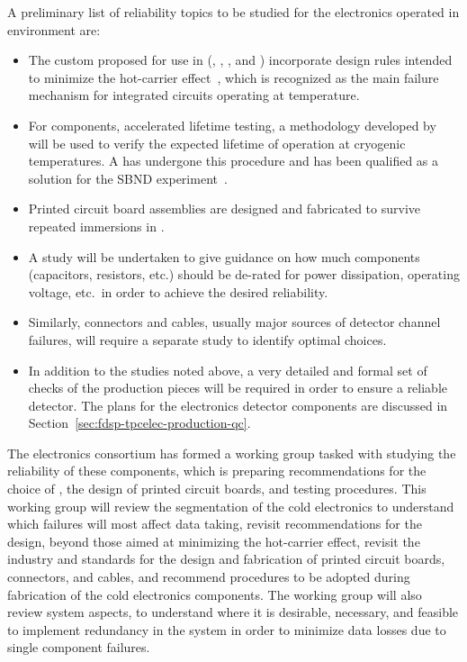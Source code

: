 A preliminary list of reliability topics to be studied for the  electronics operated 
in  environment are:
\begin{itemize}
\item The custom  proposed for use in  (, 
, , and ) incorporate design rules 
intended to minimize the hot-carrier effect~\cite{Li:CELAr,Hoff:2015hax}, 
which is recognized as the main failure mechanism for integrated circuits 
operating at  temperature.
\item For  components, accelerated lifetime testing, a methodology 
developed by ~\cite{nasa_nepp} will be used to verify the expected
lifetime of operation at cryogenic temperatures. A   has undergone
this procedure and has been qualified as a solution for the SBND experiment~\cite{Chen:2018zic}.
\item Printed circuit board assemblies are designed and fabricated to survive 
repeated immersions in \lntwo.
\item A study will be undertaken to give guidance on how much components (capacitors,
resistors, etc.) should be de-rated for power dissipation, operating voltage, etc.~in
order to achieve the desired reliability.
\item Similarly, connectors and cables, usually major sources of detector channel failures,
will require a separate study to identify optimal choices.
\item In addition to the  studies noted above, a very detailed
and formal set of  checks of the production pieces will be required in order to ensure
a reliable detector. The  plans for the  electronics
detector components are discussed in Section~\ref{sec:fdsp-tpcelec-production-qc}.
\end{itemize}
The  electronics consortium has formed a working group tasked with studying the reliability  
of these components, which is preparing recommendations for the choice of , 
the design of printed circuit boards, and testing procedures. This working group will review the 
segmentation of the cold electronics to understand which failures will most affect data taking, revisit recommendations for the  design, 
beyond those aimed at minimizing the hot-carrier effect, revisit the industry and 
 standards for the design and fabrication of printed circuit boards, connectors, 
and cables, and recommend  procedures to be adopted during 
fabrication of the cold electronics components. The working group will also review
system aspects, to understand where it is desirable, necessary, and feasible to implement 
redundancy in the system in order to minimize data losses due to single component failures. 
